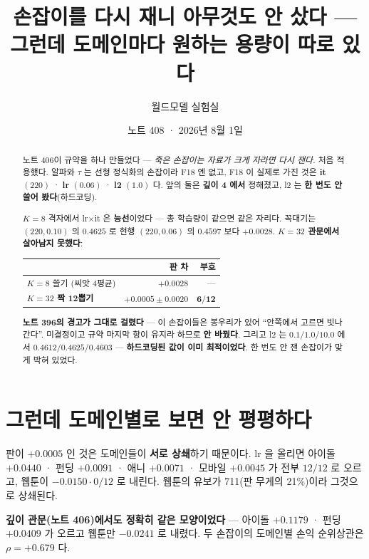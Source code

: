 \documentclass[11pt]{article}
\begin{document}
\title{손잡이를 다시 재니 아무것도 안 샀다 --- 그런데 도메인마다 원하는 용량이 따로 있다}
\author{월드모델 실험실}
\date{노트 408 · 2026년 8월 1일}
\maketitle

\begin{abstract}
노트 406이 규약을 하나 만들었다 --- \emph{죽은 손잡이는 자료가 크게 자라면
다시 잰다.} 처음 적용했다. 알파와 $\tau$ 는 선형 정식화의 손잡이라 F18 엔
없고, F18 이 실제로 가진 것은 \textbf{it} $(220)$ · \textbf{lr} $(0.06)$ ·
\textbf{l2} $(1.0)$ 다. 앞의 둘은 \textbf{깊이 4 에서} 정해졌고, l2 는
\textbf{한 번도 안 쓸어 봤다}(하드코딩).

$K{=}8$ 격자에서 lr$\times$it 은 \textbf{능선}이었다 --- 총 학습량이 같으면
같은 자리다. 꼭대기는 $(220, 0.10)$ 의 $0.4625$ 로 현행 $(220, 0.06)$ 의
$0.4597$ 보다 $+0.0028$. \textbf{$K{=}32$ 관문에서 살아남지 못했다}:

\begin{center}
\begin{tabular}{lrr}
\hline
 & 판 차 & 부호 \\
\hline
$K{=}8$ 쓸기 (씨앗 4평균) & $+0.0028$ & --- \\
\textbf{$K{=}32$ 짝 12뽑기} & $\mathbf{+0.0005 \pm 0.0020}$ & $\mathbf{6/12}$ \\
\hline
\end{tabular}
\end{center}

\textbf{노트 396의 경고가 그대로 걸렸다} --- 이 손잡이들은 봉우리가 있어
``안쪽에서 고르면 빗나간다''. 미결정이고 규약 마지막 항이 유지라 하므로
\textbf{안 바꿨다}. 그리고 l2 는 $0.1 / 1.0 / 10.0$ 에서
$0.4612 / \mathbf{0.4625} / 0.4603$ --- \textbf{하드코딩된 값이 이미
최적이었다}. 한 번도 안 잰 손잡이가 맞게 박혀 있었다.
\end{abstract}

\section{그런데 도메인별로 보면 안 평평하다}

판이 $+0.0005$ 인 것은 도메인들이 \textbf{서로 상쇄}하기 때문이다.
lr 을 올리면 아이돌 $+0.0440$ · 펀딩 $+0.0091$ · 애니 $+0.0071$ ·
모바일 $+0.0045$ 가 전부 $12/12$ 로 오르고, 웹툰이 $-0.0150 \cdot 0/12$ 로
내린다. 웹툰의 유보가 711(판 무게의 21\%)이라 그것으로 상쇄된다.

\textbf{깊이 관문(노트 406)에서도 정확히 같은 모양이었다} --- 아이돌
$+0.1179$ · 펀딩 $+0.0409$ 가 오르고 웹툰만 $-0.0241$ 로 내렸다.
두 손잡이의 도메인별 손익 순위상관은 $\rho = \mathbf{+0.679}$ 다.
\end{document}
